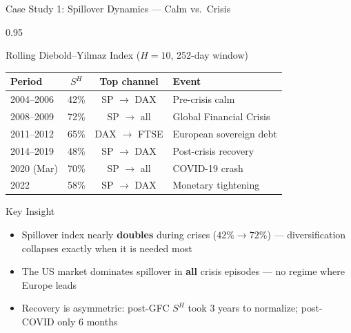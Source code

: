 \documentclass[9pt, aspectratio=169, t]{beamer}
\begin{document}
\begin{frame}{Case Study 1: Spillover Dynamics --- Calm vs.\ Crisis}
    \begin{cminipage}{0.95\textwidth}
    {\footnotesize
    \begin{block}{Rolling Diebold--Yilmaz Index ($H=10$, 252-day window)}
        \vspace{0.1cm}
        {\small
        \begin{center}
        \begin{tabular}{l|c|c|l}
            \hline
            \textbf{Period} & $S^H$ & \textbf{Top channel} & \textbf{Event} \\
            \hline
            2004--2006 & 42\% & SP $\rightarrow$ DAX & Pre-crisis calm \\
            2008--2009 & 72\% & SP $\rightarrow$ all & Global Financial Crisis \\
            2011--2012 & 65\% & DAX $\rightarrow$ FTSE & European sovereign debt \\
            2014--2019 & 48\% & SP $\rightarrow$ DAX & Post-crisis recovery \\
            2020 (Mar) & 70\% & SP $\rightarrow$ all & COVID-19 crash \\
            2022 & 58\% & SP $\rightarrow$ DAX & Monetary tightening \\
            \hline
        \end{tabular}
        \end{center}
        }
    \end{block}
    \begin{alertblock}{Key Insight}
        \begin{itemize}\setlength{\itemsep}{0pt}
            \item Spillover index nearly \textbf{doubles} during crises ($42\% \rightarrow 72\%$) --- diversification collapses exactly when it is needed most
            \item The US market dominates spillover in \textbf{all} crisis episodes --- no regime where Europe leads
            \item Recovery is asymmetric: post-GFC $S^H$ took 3 years to normalize; post-COVID only 6 months
        \end{itemize}
    \end{alertblock}
    }
    \end{cminipage}
\end{frame}
\end{document}
